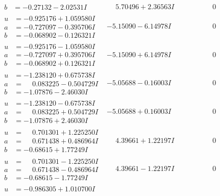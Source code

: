 \documentclass[1p]{elsarticle_modified}
\theoremstyle{definition}
\begin{document}
$$\begin{array}{c|c|c}
\begin{aligned}
b &= -0.27132 - 2.02531 I\end{aligned}
 & \phantom{-}5.70496 + 2.36563 I & \phantom{-0.000000 } 0 \\ \hline\begin{aligned}
u &= -0.925176 + 1.059580 I \\
a &= -0.727097 - 0.395706 I \\
b &= -0.068902 - 0.126321 I\end{aligned}
 & -5.15090 - 6.14978 I & \phantom{-0.000000 } 0 \\ \hline\begin{aligned}
u &= -0.925176 - 1.059580 I \\
a &= -0.727097 + 0.395706 I \\
b &= -0.068902 + 0.126321 I\end{aligned}
 & -5.15090 + 6.14978 I & \phantom{-0.000000 } 0 \\ \hline\begin{aligned}
u &= -1.238120 + 0.675738 I \\
a &= \phantom{-}0.083225 - 0.504729 I \\
b &= -1.07876 - 2.46030 I\end{aligned}
 & -5.05688 - 0.16003 I & \phantom{-0.000000 } 0 \\ \hline\begin{aligned}
u &= -1.238120 - 0.675738 I \\
a &= \phantom{-}0.083225 + 0.504729 I \\
b &= -1.07876 + 2.46030 I\end{aligned}
 & -5.05688 + 0.16003 I & \phantom{-0.000000 } 0 \\ \hline\begin{aligned}
u &= \phantom{-}0.701301 + 1.225250 I \\
a &= \phantom{-}0.671438 + 0.486964 I \\
b &= -0.68615 + 1.77249 I\end{aligned}
 & \phantom{-}4.39661 + 1.22197 I & \phantom{-0.000000 } 0 \\ \hline\begin{aligned}
u &= \phantom{-}0.701301 - 1.225250 I \\
a &= \phantom{-}0.671438 - 0.486964 I \\
b &= -0.68615 - 1.77249 I\end{aligned}
 & \phantom{-}4.39661 - 1.22197 I & \phantom{-0.000000 } 0 \\ \hline\begin{aligned}
u &= -0.986305 + 1.010700 I \\

\end{aligned}
\end{array}$$
\end{document}
